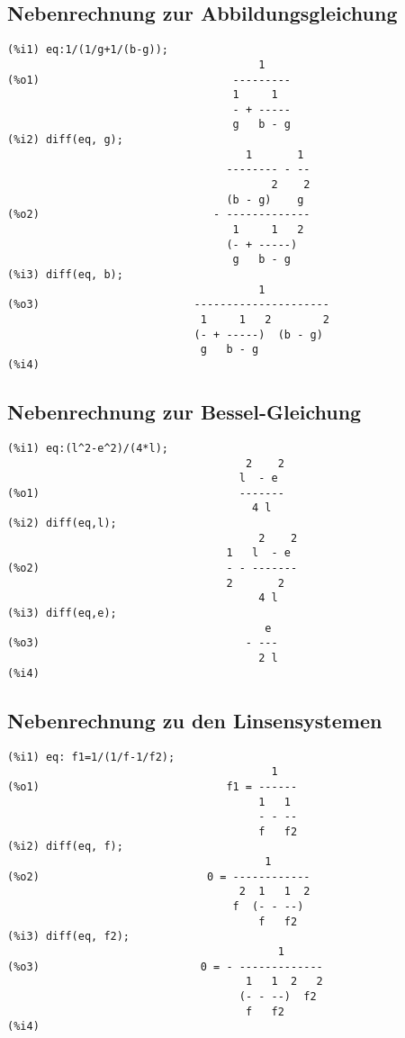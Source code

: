 \documentclass[12pt,a4paper,notitlepage]{article}
\begin{document}
\subsection{Nebenrechnung zur Abbildungsgleichung}
\begin{verbatim}
(%i1) eq:1/(1/g+1/(b-g));
                                       1
(%o1)                              ---------
                                   1     1
                                   - + -----
                                   g   b - g
(%i2) diff(eq, g);
                                     1       1
                                  -------- - --
                                         2    2
                                  (b - g)    g
(%o2)                           - -------------
                                   1     1   2
                                  (- + -----)
                                   g   b - g
(%i3) diff(eq, b);
                                       1
(%o3)                        ---------------------
                              1     1   2        2
                             (- + -----)  (b - g)
                              g   b - g
(%i4) 
\end{verbatim}
\subsection{Nebenrechnung zur Bessel-Gleichung}
\begin{verbatim}
(%i1) eq:(l^2-e^2)/(4*l);
                                     2    2
                                    l  - e
(%o1)                               -------
                                      4 l
(%i2) diff(eq,l);
                                       2    2
                                  1   l  - e
(%o2)                             - - -------
                                  2       2
                                       4 l
(%i3) diff(eq,e);
                                        e
(%o3)                                - ---
                                       2 l
(%i4)
\end{verbatim}
\subsection{Nebenrechnung zu den Linsensystemen}
\begin{verbatim}
(%i1) eq: f1=1/(1/f-1/f2);
                                         1
(%o1)                             f1 = ------
                                       1   1
                                       - - --
                                       f   f2
(%i2) diff(eq, f);
                                        1
(%o2)                          0 = ------------
                                    2  1   1  2
                                   f  (- - --)
                                       f   f2
(%i3) diff(eq, f2);
                                          1
(%o3)                         0 = - -------------
                                     1   1  2   2
                                    (- - --)  f2
                                     f   f2
(%i4)
\end{verbatim}
\end{document}
